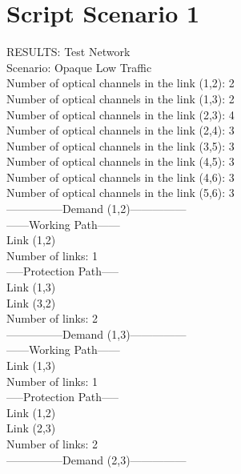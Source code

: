 \clearpage

\section{Script Scenario 1}

\qquad RESULTS: Test Network \\

\quad Scenario: Opaque Low Traffic \\

Number of optical channels in the link (1,2): 2 \\
\quad Number of optical channels in the link (1,3): 2 \\
\quad Number of optical channels in the link (2,3): 4 \\
\quad Number of optical channels in the link (2,4): 3 \\
\quad Number of optical channels in the link (3,5): 3 \\
\quad Number of optical channels in the link (4,5): 3 \\
\quad Number of optical channels in the link (4,6): 3 \\
\quad Number of optical channels in the link (5,6): 3 \\

---------------Demand (1,2)--------------- \\

------Working Path------ \\
Link  (1,2) \\
Number of links: 1 \\

-----Protection Path----- \\
Link  (1,3) \\
Link  (3,2) \\
Number of links: 2 \\

---------------Demand (1,3)--------------- \\

------Working Path------ \\
Link  (1,3) \\
Number of links: 1 \\

-----Protection Path----- \\
Link  (1,2) \\
Link  (2,3) \\
Number of links: 2 \\

---------------Demand (2,3)--------------- \\

